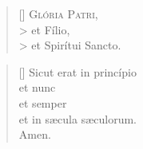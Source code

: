 \documentclass[omni.tex]{subfiles}
\begin{document}
\settowidth{\versewidth}{Et ne nos ind\'ucas in tentati\'onem}

\begin{verse}[\versewidth]
\lettrine[lhang=1.0,nindent=0em]{G}{l\'oria Patri}, \\>
et F\'ilio, \\>
et Spir\'itui Sancto.
\end{verse}

\begin{verse}[\versewidth]
Sicut erat in princ\'ipio \\
et nunc \\
et semper \\
et in s\ae cula s\ae culorum. \\
Amen. \\[7\baselineskip]
\end{verse}

\pagebreak
\end{document}
